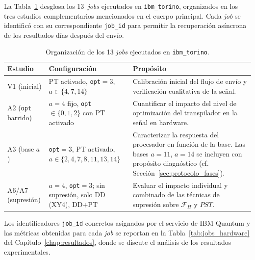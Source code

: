 \documentclass[12pt, spanish]{book}
\begin{document}
La Tabla~\ref{tab:jobs_hardware_apendice} desglosa los 13~\textit{jobs} ejecutados en \texttt{ibm\_torino}, organizados en los tres estudios complementarios mencionados en el cuerpo principal. Cada \textit{job} se identificó con su correspondiente \texttt{job\_id} para permitir la recuperación asíncrona de los resultados días después del envío.

\begin{table}[H]
    \centering
    \caption{Organización de los 13 \textit{jobs} ejecutados en \texttt{ibm\_torino}.}
    \label{tab:jobs_hardware_apendice}
    \footnotesize
    \begin{tabular}{p{} p{} p{}}
        \toprule
        \textbf{Estudio} & \textbf{Configuración} & \textbf{Propósito} \\
        \midrule
        V1 (inicial)
            & PT activado, \texttt{opt}$=3$, $a \in \{4, 7, 14\}$
            & Calibración inicial del flujo de envío y verificación cualitativa de la señal. \\
        \midrule
        A2 (\texttt{opt} barrido)
            & $a = 4$ fijo, \texttt{opt}~$\in \{0, 1, 2\}$ con PT activado
            & Cuantificar el impacto del nivel de optimización del transpilador en la señal en hardware. \\
        \midrule
        A3 (base $a$)
            & \texttt{opt}$=3$, PT activado, $a \in \{2, 4, 7, 8, 11, 13, 14\}$
            & Caracterizar la respuesta del procesador en función de la base. Las bases $a = 11$, $a = 14$ se incluyen con propósito diagnóstico (cf. Sección~\ref{sec:protocolo_fases}). \\
        \midrule
        A6/A7 (supresión)
            & $a = 4$, \texttt{opt}$=3$; sin supresión, solo DD (XY4), DD$+$PT
            & Evaluar el impacto individual y combinado de las técnicas de supresión sobre $\mathcal{F}_H$ y $PST$. \\
        \bottomrule
    \end{tabular}
\end{table}

Los identificadores \texttt{job\_id} concretos asignados por el servicio de IBM Quantum y las métricas obtenidas para cada \textit{job} se reportan en la Tabla~\ref{tab:jobs_hardware} del Capítulo~\ref{chap:resultados}, donde se discute el análisis de los resultados experimentales.

\end{document}
